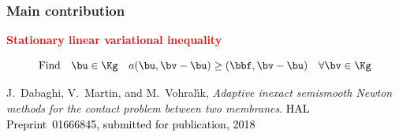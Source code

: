 \documentclass[aspectratio=169]{beamer}
\begin{document}
\begin{frame}
\frametitle{Main contribution}
\vspace{-0.2 cm}
\textcolor{red}{\textbf{Stationary linear variational inequality}}

\begin{equation*}
\vspace{-0.2 cm}
\mbox{Find} \quad \bu \in \Kg \quad a(\bu,\bv-\bu) \geq (\bbf,\bv-\bu) \quad \forall \bv \in \Kg
\end{equation*}


\vspace{-0.4 cm}
\begin{figure}
\end{figure}
\begin{thebibliography}{10}

 \scriptsize{
 {\sc J.~Dabaghi, V.~Martin, and M.~Vohral{\'{\i}}k}, {\em Adaptive inexact
  semismooth Newton methods for the contact problem between two membranes}.
 \textcolor{black}{HAL Preprint~01666845, submitted for publication, 2018}
 }

\end{thebibliography}
\end{frame}
%
%
\end{document}
